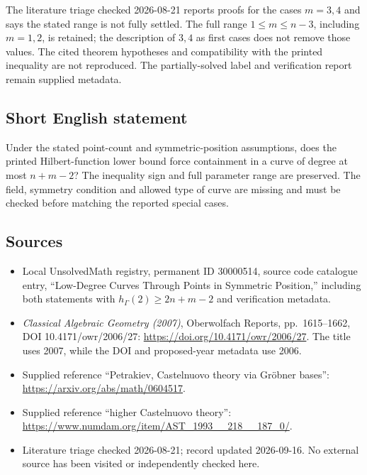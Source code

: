 \documentclass[11pt]{article}
\begin{document}
The literature triage checked 2026-08-21 reports proofs for the cases \(m=3,4\) and says the stated range is not fully settled. The full range \(1\leq m\leq n-3\), including \(m=1,2\), is retained; the description of \(3,4\) as first cases does not remove those values. The cited theorem hypotheses and compatibility with the printed inequality are not reproduced. The partially-solved label and verification report remain supplied metadata.
\subsection{Short English statement}
Under the stated point-count and symmetric-position assumptions, does the printed Hilbert-function lower bound force containment in a curve of degree at most \(n+m-2\)? The inequality sign and full parameter range are preserved. The field, symmetry condition and allowed type of curve are missing and must be checked before matching the reported special cases.
\subsection{Sources}
\begin{itemize}
\item Local UnsolvedMath registry, permanent ID 30000514, source code catalogue entry, ``Low-Degree Curves Through Points in Symmetric Position,'' including both statements with \(h_\Gamma(2)\geq2n+m-2\) and verification metadata.
\item \emph{Classical Algebraic Geometry (2007)}, Oberwolfach Reports, pp.\ 1615--1662, DOI 10.4171/owr/2006/27: \url{https://doi.org/10.4171/owr/2006/27}. The title uses 2007, while the DOI and proposed-year metadata use 2006.
\item Supplied reference ``Petrakiev, Castelnuovo theory via Gr\"obner bases'': \url{https://arxiv.org/abs/math/0604517}.
\item Supplied reference ``higher Castelnuovo theory'': \url{https://www.numdam.org/item/AST_1993__218__187_0/}.
\item Literature triage checked 2026-08-21; record updated 2026-09-16. No external source has been visited or independently checked here.
\end{itemize}
\end{document}
